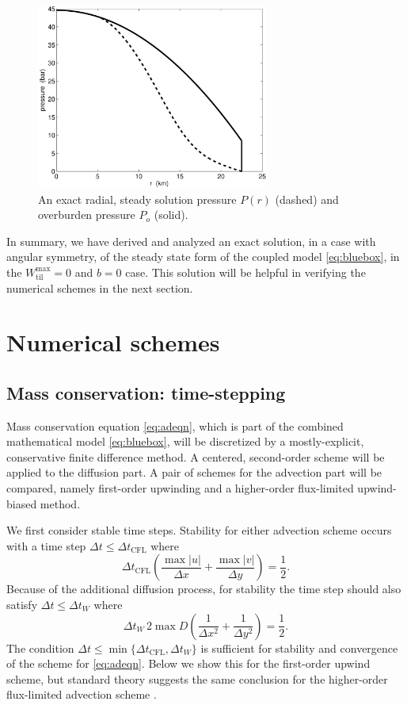 \documentclass[gmd]{copernicus}   %
\newcommand{\text}{\textrm}
\newcommand{\Wtilmax}{W_{\text{til}}^{\text{max}}}
\begin{document}
\begin{figure}[ht]
\includegraphics[width=3.0in,keepaspectratio=true]{exact-P-plot}
\caption{An exact radial, steady solution pressure $P(r)$ (dashed) and overburden pressure $P_o$ (solid).}
\label{fig:Pexact}
\end{figure}

In summary, we have derived and analyzed an exact solution, in a case with angular symmetry, of the steady state form of the coupled model \eqref{eq:bluebox}, in the $\Wtilmax=0$ and $b=0$ case.  This solution will be helpful in verifying the numerical schemes in the next section.


\section{Numerical schemes}  \label{sec:num}

\subsection{Mass conservation: time-stepping}  Mass conservation equation \eqref{eq:adeqn}, which is part of the combined mathematical model \eqref{eq:bluebox}, will be discretized by a mostly-explicit, conservative finite difference method.   A centered, second-order scheme will be applied to the diffusion part.  A pair of schemes for the advection part will be compared, namely first-order upwinding and a higher-order flux-limited upwind-biased method.

We first consider stable time steps.  Stability for either advection scheme occurs with a time step $\Delta t \le \Delta t_{\text{CFL}}$ where
\begin{equation}
\Delta t_{\text{CFL}} \left(\frac{\max |u|}{\Delta x} + \frac{\max |v|}{\Delta y}\right) = \frac{1}{2}. \label{eq:dtCFL}
\end{equation}
Because of the additional diffusion process, for stability the time step should also satisfy $\Delta t \le \Delta t_{W}$  where \citep{MortonMayers}
\begin{equation}
\Delta t_W\, 2 \max D \left(\frac{1}{\Delta x^2} + \frac{1}{\Delta y^2}\right) = \frac{1}{2}. \label{eq:dtDIFFW}
\end{equation}
The condition $\Delta t \le \min\{\Delta t_{\text{CFL}}, \Delta t_W\}$ is sufficient for stability and convergence of the scheme for \eqref{eq:adeqn}.  Below we show this for the first-order upwind scheme, but standard theory suggests the same conclusion for the higher-order flux-limited advection scheme \citep{HundsdorferVerwer2010}.
\end{document}
